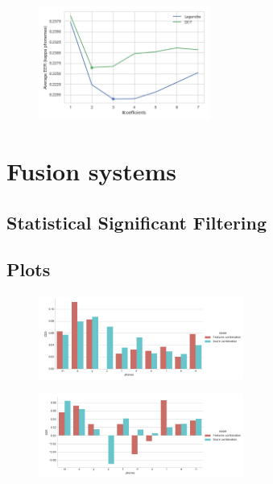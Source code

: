 \begin{figure}[H]
	\centering
	\includegraphics[width=0.5\textwidth]{files/figures/results/legendre-dct/legendre-dct-coefficients.png}
\end{figure}


\section{Fusion systems}

\subsection{Statistical Significant Filtering}

\subsection{Plots}

\begin{figure}[H]
	\centering
	\includegraphics[width=0.6\textwidth]{files/figures/results/relatives/relatives-fusion-systems-dev-kappa.png}
\end{figure}

\begin{figure}[H]
	\centering
	\includegraphics[width=0.6\textwidth]{files/figures/results/relatives/relative-fusion-systems-heldout-kappa.png}
\end{figure}
